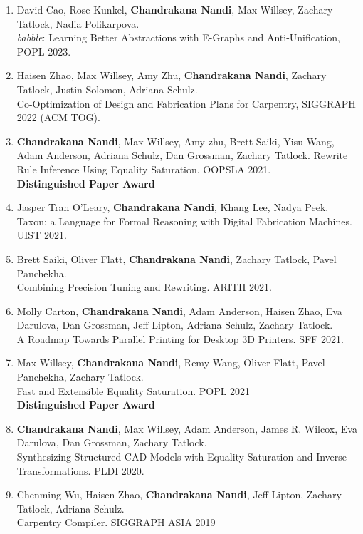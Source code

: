 \documentclass[margin, 10pt]{res} %
\begin{document}
\begin{resume}
\begin{enumerate}
  \item David Cao, Rose Kunkel, \textbf{Chandrakana Nandi}, Max Willsey, Zachary Tatlock, Nadia Polikarpova. \\
    \textit{babble}: Learning Better Abstractions with E-Graphs and Anti-Unification, POPL 2023.

  \item Haisen  Zhao, Max Willsey, Amy Zhu, \textbf{Chandrakana Nandi}, Zachary Tatlock, Justin Solomon, Adriana Schulz. \\
    Co-Optimization of Design and Fabrication Plans for Carpentry, SIGGRAPH 2022 (ACM TOG).

  \item \textbf{Chandrakana Nandi}, Max Willsey, Amy zhu, Brett Saiki, Yisu Wang, Adam Anderson, Adriana Schulz, Dan Grossman, Zachary Tatlock.
    Rewrite Rule Inference Using Equality Saturation. OOPSLA 2021. \\
    \textbf{Distinguished Paper Award}

  \item Jasper Tran O'Leary, \textbf{Chandrakana Nandi}, Khang Lee, Nadya Peek. \\
  Taxon: a Language for Formal Reasoning with Digital Fabrication Machines. UIST 2021.

\item Brett Saiki, Oliver Flatt, \textbf{Chandrakana Nandi}, Zachary Tatlock, Pavel Panchekha. \\
  Combining Precision Tuning and Rewriting. ARITH 2021.

\item Molly Carton, \textbf{Chandrakana Nandi}, Adam Anderson, Haisen Zhao, Eva Darulova, Dan Grossman, Jeff Lipton, Adriana Schulz, Zachary Tatlock. \\
  A Roadmap Towards Parallel Printing for Desktop 3D Printers. SFF 2021.

\item Max Willsey, \textbf{Chandrakana Nandi}, Remy Wang, Oliver Flatt, Pavel Panchekha, Zachary Tatlock. \\
    Fast and Extensible Equality Saturation. POPL 2021 \\
    \textbf{Distinguished Paper Award}

  \item \textbf{Chandrakana Nandi}, Max Willsey, Adam Anderson, James R. Wilcox, Eva Darulova, Dan Grossman, Zachary Tatlock. \\
    Synthesizing Structured CAD Models with Equality Saturation and Inverse Transformations. PLDI 2020.
  \item Chenming Wu, Haisen Zhao, \textbf{Chandrakana Nandi}, Jeff Lipton, Zachary Tatlock, Adriana Schulz. \\
    Carpentry Compiler. SIGGRAPH ASIA 2019


\end{enumerate}
\end{resume}
\end{document}
